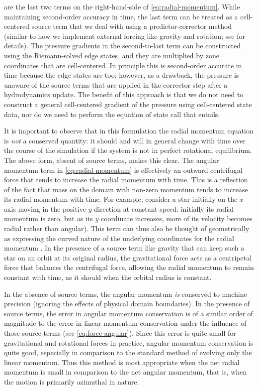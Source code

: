 \documentclass[twocolumn,numberedappendix]{../aastex6}
\begin{document}
are the last two terms on the right-hand-side of \autoref{eq:radial-momentum}.
While maintaining second-order accuracy in time, the last term can be treated as a
cell-centered source term that we deal with using a predictor-corrector
method (similar to how we implement external forcing like gravity and rotation; see
\cite{castro} for details). The pressure gradients in the second-to-last term can be
constructed using the Riemann-solved edge states, and they are multiplied by zone
coordinates that are cell-centered. In principle this is second-order accurate in time
because the edge states are too; however, as a drawback, the pressure is unaware of the
source terms that are applied in the corrector step after a hydrodynamics update. The
benefit of this approach is that we do not need to construct a general cell-centered
gradient of the pressure using cell-centered state data, nor do we need to perform the
equation of state call that entails.

It is important to observe that in this formulation the radial momentum equation
is \textit{not} a conserved quantity: it should and will in general change with
time over the course of the simulation if the system is not in perfect rotational
equilibrium. The above form, absent of source terms, makes this clear. The angular
momentum term in \autoref{eq:radial-momentum} is effectively an outward centrifugal
force that tends to increase the radial momentum with time. This is a reflection of
the fact that mass on the domain with non-zero momentum tends to increase its radial
momentum with time. For example, consider a star initially on the $x$ axis moving
in the positive $y$ direction at constant speed: initially its radial momentum is
zero, but as its $y$ coordinate increases, more of its velocity becomes radial rather
than angular).  This term can thus also be thought of geometrically as expressing the
curved nature of the underlying coordinates for the radial momentum
\citep{motl:2002}. In the presence of a source term like gravity that can keep
such a star on an orbit at its original radius, the gravitational force acts as a
centripetal force that balances the centrifugal force, allowing the radial momentum
to remain constant with time, as it should when the orbital radius is constant.

In the absence of source terms, the angular momentum \textit{is} conserved
to machine precision (ignoring the effects of physical domain boundaries). In the
presence of source terms, the error in angular momentum conservation is of a
similar order of magnitude to the error in linear momentum conservation under
the influence of those source terms (see \autoref{eq:force-angular}). Since this
error is quite small for gravitational and rotational forces in practice, angular
momentum conservation is quite good, especially in comparison to the standard
method of evolving only the linear momentum. Thus this method is most appropriate
when the net radial momentum is small in comparison to the net angular momentum,
that is, when the motion is primarily azimuthal in nature.
\end{document}
